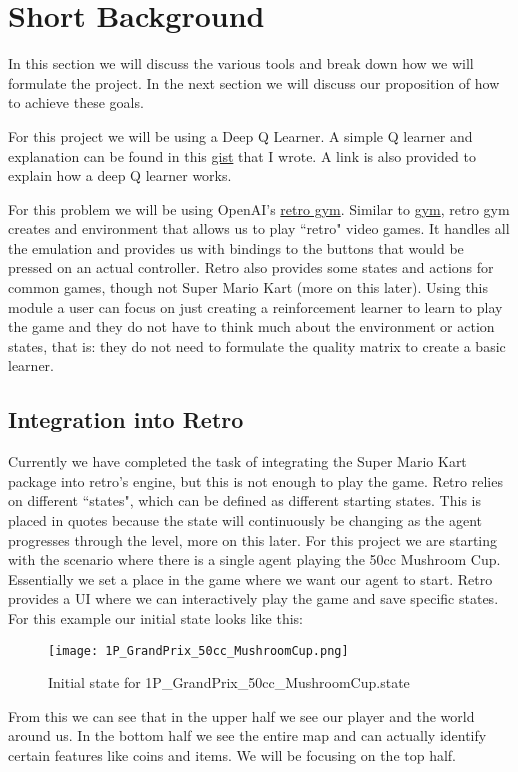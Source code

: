 \section{Short Background}
In this section we will discuss the various tools and break down how we will
formulate the project. In the next section we will discuss our proposition of
how to achieve these goals.

For this project we will be using a Deep Q Learner. A simple Q learner and
explanation can be found in this 
\href{https://gist.github.com/stevenwalton/4e4b664d494b35be2d6882c7e50eb893}
{gist} that I wrote. A link is also provided to explain how a deep Q learner
works. 

For this problem we will be using OpenAI's \href{https://github.com/openai/retro/}
{retro gym}. Similar to \href{https://github.com/openai/gym}{gym}, retro gym 
creates and environment that allows us to play ``retro" video games. It handles
all the emulation and provides us with bindings to the buttons that would be
pressed on an actual controller. Retro also provides some states and actions for
common games, though not Super Mario Kart (more on this later). Using this
module a user can focus on just creating a reinforcement learner to learn to 
play the game and they do not have to think much about the environment or action
states, that is: they do not need to formulate the quality matrix to create a
basic learner. 

\subsection{Integration into Retro}
Currently we have completed the task of integrating the Super Mario Kart package
into retro's engine, but this is not enough to play the game. Retro relies on 
different ``states", which can be defined as different starting states. 
This is placed in quotes because the state will continuously be changing as
the agent progresses through the level, more on this later. For
this project we are starting with the scenario where there is a single agent
playing the 50cc Mushroom Cup. Essentially we set a place in the game where we
want our agent to start. Retro provides a UI where we can interactively play
the game and save specific states. For this example our initial state looks like
this:
\begin{figure}[h!]
    \centering
    \texttt{[image: 1P\_GrandPrix\_50cc\_MushroomCup.png]}
    \caption{Initial state for 1P\_GrandPrix\_50cc\_MushroomCup.state}
\end{figure}
\FloatBarrier
From this we can see that in the upper half we see our player and the world
around us. In the bottom half we see the entire map and can actually identify 
certain features like coins and items. We will be focusing on the top half.

